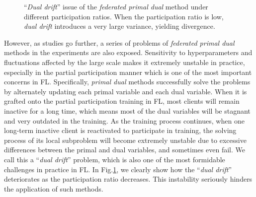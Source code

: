 \begin{figure}
\centering
\vspace{-0.6cm}
    \!\!\!
 \vskip -0.04in
\caption{``\textit{Dual drift}'' issue of the \textit{federated primal dual} method under different participation ratios. When the participation ratio is low, \textit{dual drift} introduces a very large variance, yielding divergence.}
\label{dual drift}
 \vskip -0.1in
\end{figure}

However, as studies go further, a series of problems of \textit{federated primal dual} methods in the experiments are also exposed. Sensitivity to hyperparameters and fluctuations affected by the large scale makes it extremely unstable in practice, especially in the partial participation manner which is one of the most important concerns in FL. Specifically, \textit{primal dual} methods successfully solve the problems by alternately updating each primal variable and each dual variable. When it is grafted onto the partial participation training in FL, most clients will remain inactive for a long time, which means most of the dual variables will be stagnant and very outdated in the training. As the training process continues, when one long-term inactive client is reactivated to participate in training, the solving process of its local subproblem will become extremely unstable due to excessive differences between the primal and dual variables, and sometimes even fail. We call this a ``\textit{dual drift}'' problem, which is also one of the most formidable challenges in practice in FL. In Fig.\ref{dual drift}, we clearly show how the ``\textit{dual drift}'' deteriorates as the participation ratio decreases. This instability seriously hinders the application of such methods.

